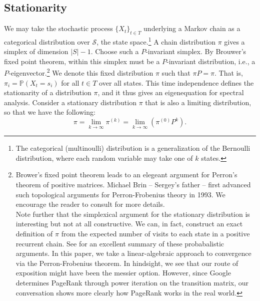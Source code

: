 \documentclass[12pt]{article}
\newcommand{\iterate}[2]{#1^{(#2)}}
\newcommand{\parens}[1]{ \left( #1 \right) }
\newcommand{\prob}{\mathbb{P}}
\begin{document}
\subsection{Stationarity}
We may take the stochastic process $\{X_t\}_{t \in T}$ underlying a Markov chain
as a categorical distribution over $\mathcal{S}$, the state space.\footnote{The
  categorical (multinoulli) distribution is a generalization of the Bernoulli
  distribution, where each random variable may take one of $k$ states.} A chain
distribution $\pi$ gives a simplex of dimension $|S| - 1$. Choose such a
$P$-invariant simplex. By Brouwer's fixed point theorem, within this simplex
must be a $P$-invariant distribution, i.e., a
$P$-eigenvector.\footnote{Brower's fixed point theorem leads to an elegeant
  argument for Perron's theorem of positive matrices. Michael Brin -- Sergey's
  father -- first advanced such topological arguments for Perron-Frobenius
  theory in 1993. We encourage the reader to consult
  \cite{boyleBasicPerronFrobeniusTheory} for more details. \vspace{0.5em} \\
  Note further that the simplexical argument for the stationary distribution is
  interesting but not at all constructive. We can, in fact, construct an exact
  definition of $\pi$ from the expected number of visits to each state in a
  positive recurrent chain. See \cite{freedmanConvergenceTheoremFinite} for an
  excellent summary of these probabalistic arguments. In this paper, we take a
  linear-algebraic approach to convergence via the Perron-Frobenius theorem. In
  hindsight, we see that our route of exposition might have been the messier
  option. However, since Google determines PageRank through power iteration on
  the transition matrix, our conversation shows more clearly how PageRank works
  in the real world.} We denote this fixed distribution $\pi$ such that
$\pi P = \pi$. That is, $\pi_i = \prob(X_t = s_i)$ for all $t\in T$ over all
states. This time independence defines the stationarity of a distribution $\pi$,
and it thus gives an eigenequation for spectral analysis. Consider a stationary
distribution $\pi$ that is also a limiting distribution, so that we have the
following:
\begin{equation*}
  \pi = \lim_{k\to\infty}{{\iterate{\pi}{k}}} = \lim_{k\to\infty}{\parens{{\iterate{\pi}{0}} P^k}}.
\end{equation*}
\end{document}
